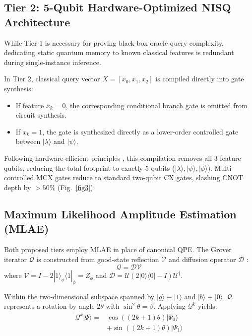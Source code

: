 \documentclass[conference]{IEEEtran}
\begin{document}
\subsection{Tier 2: 5-Qubit Hardware-Optimized NISQ Architecture}\label{subsec4.2}

While Tier 1 is necessary for proving black-box oracle query complexity, dedicating static quantum memory to known classical features is redundant during single-instance inference.

In Tier 2, classical query vector $X = [x_0, x_1, x_2]$ is compiled directly into gate synthesis:
\begin{itemize}
    \item If feature $x_k = 0$, the corresponding conditional branch gate is omitted from circuit synthesis.
    \item If $x_k = 1$, the gate is synthesized directly as a lower-order controlled gate between $|\lambda\rangle$ and $|\psi\rangle$.
\end{itemize}
Following hardware-efficient principles \cite{kandala2017hardware}, this compilation removes all 3 feature qubits, reducing the total footprint to exactly 5 qubits ($|\lambda\rangle, |\psi\rangle, |\phi\rangle$). Multi-controlled MCX gates reduce to standard two-qubit CX gates, slashing CNOT depth by $> 50\%$ (Fig.~\ref{fig3}).

\subsection{Maximum Likelihood Amplitude Estimation (MLAE)}\label{subsec4.3}

Both proposed tiers employ MLAE \cite{suzuki2020amplitude} in place of canonical QPE. The Grover iterator $\mathcal{Q}$ is constructed from good-state reflection $\mathcal{V}$ and diffusion operator $\mathcal{D}$ \cite{grover1996fast,uno2021efficient}:
\begin{equation}\label{eq10}
\mathcal{Q} = \mathcal{D}\mathcal{V}
\end{equation}
where $\mathcal{V} = I - 2|1\rangle_\phi\langle 1|_\phi = Z_\phi$ and $\mathcal{D} = \mathcal{U}(2|0\rangle\langle 0| - I)\mathcal{U}^\dagger$.

Within the two-dimensional subspace spanned by $|g\rangle \equiv |1\rangle$ and $|b\rangle \equiv |0\rangle$, $\mathcal{Q}$ represents a rotation by angle $2\theta$ with $\sin^2\theta = \beta$. Applying $\mathcal{Q}^k$ yields:
\begin{equation}\label{eq11}
\begin{aligned}
\mathcal{Q}^k |\Psi\rangle = &\cos((2k + 1)\theta)|\Psi_0\rangle \\
&+ \sin((2k + 1)\theta)|\Psi_1\rangle
\end{aligned}
\end{equation}
\end{document}
